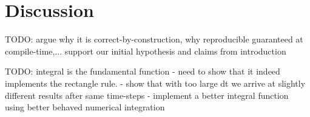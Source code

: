 \section{Discussion}
TODO: argue why it is correct-by-construction, why reproducible guaranteed at compile-time,... support our initial hypothesis and claims from introduction

TODO: integral is the fundamental function
- need to show that it indeed implements the rectangle rule. 
- show that with too large dt we arrive at slightly different results after same time-steps
- implement a better integral function using better behaved numerical integration